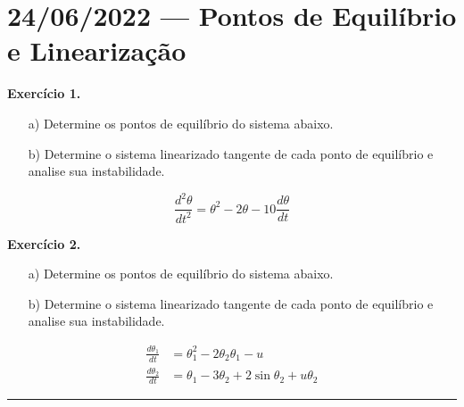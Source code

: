\section*{24/06/2022 --- Pontos de Equilíbrio e Linearização}
\noindent\textbf{\sffamily Exercício 1.}
\begin{itemize}
	\item [a)] 
	Determine os pontos de equilíbrio do sistema abaixo.
	
	\item [b)] 
	Determine o sistema linearizado tangente de cada ponto de equilíbrio e analise sua instabilidade.
\end{itemize}
%
\[
\frac{d^2\theta}{dt^2} = 
\theta^2 - 2\theta - 10\frac{d\theta}{dt} 
\]
%

\noindent\textbf{\sffamily Exercício 2.}
\begin{itemize}
	\item [a)] 
	Determine os pontos de equilíbrio do sistema abaixo.
	
	\item [b)] 
	Determine o sistema linearizado tangente de cada ponto de equilíbrio e analise sua instabilidade.
\end{itemize}
%
\begin{align*}
	\frac{d\theta_1}{dt} &= 
	\theta_1^2 - 2\theta_2\theta_1 - u \\
	\frac{d\theta_2}{dt} &= 
	\theta_1 -3\theta_2 + 2\sin\theta_2 + u\theta_2
\end{align*}
%
\rule{\textwidth}{0.5pt}



